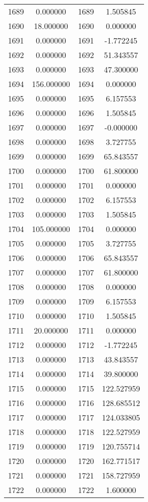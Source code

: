 \documentclass[12pt]{article}
\begin{document}
\begin{longtable}{@{}cccc@{}}
1689 & 0.000000 & 1689 & 1.505845 \\
1690 & 18.000000 & 1690 & 0.000000 \\
1691 & 0.000000 & 1691 & -1.772245 \\
1692 & 0.000000 & 1692 & 51.343557 \\
1693 & 0.000000 & 1693 & 47.300000 \\
1694 & 156.000000 & 1694 & 0.000000 \\
1695 & 0.000000 & 1695 & 6.157553 \\
1696 & 0.000000 & 1696 & 1.505845 \\
1697 & 0.000000 & 1697 & -0.000000 \\
1698 & 0.000000 & 1698 & 3.727755 \\
1699 & 0.000000 & 1699 & 65.843557 \\
1700 & 0.000000 & 1700 & 61.800000 \\
1701 & 0.000000 & 1701 & 0.000000 \\
1702 & 0.000000 & 1702 & 6.157553 \\
1703 & 0.000000 & 1703 & 1.505845 \\
1704 & 105.000000 & 1704 & 0.000000 \\
1705 & 0.000000 & 1705 & 3.727755 \\
1706 & 0.000000 & 1706 & 65.843557 \\
1707 & 0.000000 & 1707 & 61.800000 \\
1708 & 0.000000 & 1708 & 0.000000 \\
1709 & 0.000000 & 1709 & 6.157553 \\
1710 & 0.000000 & 1710 & 1.505845 \\
1711 & 20.000000 & 1711 & 0.000000 \\
1712 & 0.000000 & 1712 & -1.772245 \\
1713 & 0.000000 & 1713 & 43.843557 \\
1714 & 0.000000 & 1714 & 39.800000 \\
1715 & 0.000000 & 1715 & 122.527959 \\
1716 & 0.000000 & 1716 & 128.685512 \\
1717 & 0.000000 & 1717 & 124.033805 \\
1718 & 0.000000 & 1718 & 122.527959 \\
1719 & 0.000000 & 1719 & 120.755714 \\
1720 & 0.000000 & 1720 & 162.771517 \\
1721 & 0.000000 & 1721 & 158.727959 \\
1722 & 0.000000 & 1722 & 1.600000 \\

\end{longtable}
\end{document}
